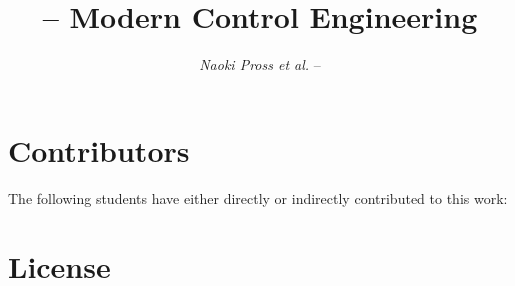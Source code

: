 \documentclass[margin=small]{tex/hsrzf}
\author{\textsl{Naoki Pross et al.} -- \texttt{\theauthoremail}}
\title{\texttt{\themodule} -- Modern Control Engineering}
\date{\thesemester}
\begin{document}

\maketitle


\section*{Contributors}

The following students have either directly or indirectly contributed to this work: \thecontributors

\section*{License}
\doclicenseThis

\tableofcontents

\clearpage
\twocolumn

\setcounter{page}{1}





\appendix






\onecolumn

\end{document}

